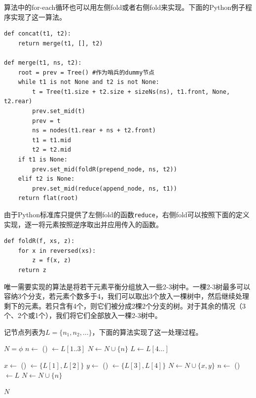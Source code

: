 \documentclass[b5paper]{ctexart}
\begin{document}
算法中的for-each循环也可以用左侧fold或者右侧fold来实现。下面的Python例子程序实现了这一算法。

\lstset{language=Python}
\begin{lstlisting}
def concat(t1, t2):
    return merge(t1, [], t2)

def merge(t1, ns, t2):
    root = prev = Tree() #作为哨兵的dummy节点
    while t1 is not None and t2 is not None:
        t = Tree(t1.size + t2.size + sizeNs(ns), t1.front, None, t2.rear)
        prev.set_mid(t)
        prev = t
        ns = nodes(t1.rear + ns + t2.front)
        t1 = t1.mid
        t2 = t2.mid
    if t1 is None:
        prev.set_mid(foldR(prepend_node, ns, t2))
    elif t2 is None:
        prev.set_mid(reduce(append_node, ns, t1))
    return flat(root)
\end{lstlisting}

由于Python标准库只提供了左侧fold的函数\texttt{reduce}，右侧fold可以按照下面的定义实现，逐一将元素按照逆序取出并应用传入的函数。

\begin{lstlisting}
def foldR(f, xs, z):
    for x in reversed(xs):
        z = f(x, z)
    return z
\end{lstlisting}

唯一需要实现的算法是将若干元素平衡分组放入一些2-3树中。一棵2-3树最多可以容纳3个分支，若元素个数多于4，我们可以取出3个放入一棵树中，然后继续处理剩下的元素。若只含有4个，则它们被分成2棵2个分支的树。对于其余的情况（3个、2个或1个），我们将它们全部放入一棵2-3树中。

记节点列表为$L=\{ n_1, n_2, ... \}$，下面的算法实现了这一处理过程。

\begin{algorithmic}
  \State $N = \phi$
    \State $n \gets$ ()
    \State {} $\gets L[1..3]$  
    \State $N \gets N \cup \{ n \}$
    \State $L \gets L[4...]$ 
  \EndWhile

    \State $x \gets$ ()
    \State {} $\gets \{L[1], L[2]\}$
    \State $y \gets$ ()
    \State {} $\gets \{L[3], L[4]\}$
    \State $N \gets N \cup \{ x, y \}$
    \State $n \gets$ ()
    \State {} $\gets L$
    \State $N \gets N \cup \{ n \}$
  \EndIf

  \State \Return $N$
\EndFunction
\end{algorithmic}
\end{document}
